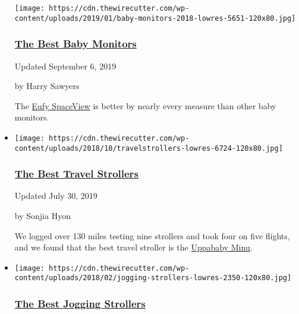 \begin{itemize}
  \texttt{[image: https://cdn.thewirecutter.com/wp-content/uploads/2019/01/baby-monitors-2018-lowres-5651-120x80.jpg]}

  \hypertarget{the-best-baby-monitors}{%
  \subsubsection{\texorpdfstring{\href{https://www.nytimes3xbfgragh.onion/wirecutter/reviews/best-baby-monitor/}{The
  Best Baby
  Monitors}}{The Best Baby Monitors}}\label{the-best-baby-monitors}}

  Updated September 6, 2019

  by Harry Sawyers

  The
  \href{https://www.nytimes3xbfgragh.onion/wirecutter/out/link/29762/149815/4/86505/?merchant=Amazon}{Eufy
  SpaceView} is better by nearly every measure than other baby monitors.
\item
  \href{https://www.nytimes3xbfgragh.onion/wirecutter/reviews/best-travel-strollers/}{}

  \texttt{[image: https://cdn.thewirecutter.com/wp-content/uploads/2018/10/travelstrollers-lowres-6724-120x80.jpg]}

  \hypertarget{the-best-travel-strollers}{%
  \subsubsection{\texorpdfstring{\href{https://www.nytimes3xbfgragh.onion/wirecutter/reviews/best-travel-strollers/}{The
  Best Travel
  Strollers}}{The Best Travel Strollers}}\label{the-best-travel-strollers}}

  Updated July 30, 2019

  by Sonjia Hyon

  We logged over 130 miles testing nine strollers and took four on five
  flights, and we found that the best travel stroller is the
  \href{https://www.nytimes3xbfgragh.onion/wirecutter/out/link/29269/149186/4/83101/?merchant=Amazon}{Uppababy
  Minu}.
\item
  \href{https://www.nytimes3xbfgragh.onion/wirecutter/reviews/best-jogging-strollers/}{}

  \texttt{[image: https://cdn.thewirecutter.com/wp-content/uploads/2018/02/jogging-strollers-lowres-2350-120x80.jpg]}

  \hypertarget{the-best-jogging-strollers}{%
  \subsubsection{\texorpdfstring{\href{https://www.nytimes3xbfgragh.onion/wirecutter/reviews/best-jogging-strollers/}{The
  Best Jogging
  Strollers}}{The Best Jogging Strollers}}\label{the-best-jogging-strollers}}


\end{itemize}

